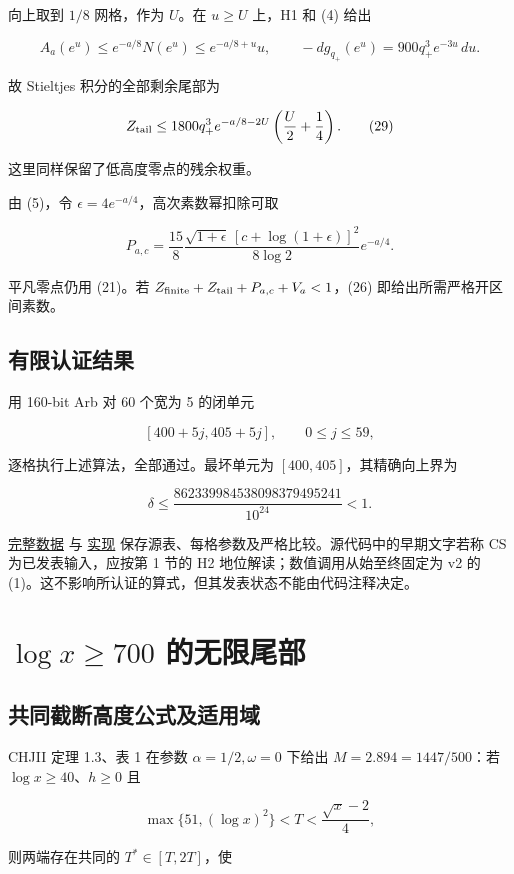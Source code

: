 \documentclass[UTF8,zihao=-4,fontset=fandol]{ctexart}
\begin{document}
向上取到 \(1/8\) 网格，作为 \(U\)。在 \(u\ge U\) 上，H1 和 (4) 给出

\[
A_a(e^u)\le e^{-a/8}N(e^u)\le e^{-a/8+u}u,
\qquad -dg_{q_+}(e^u)=900q_+^3e^{-3u}\,du.
\]

故 Stieltjes 积分的全部剩余尾部为

\[
Z_{\rm tail}\le1800q_+^3e^{-a/8-2U}
\left(\frac U2+\frac14\right). \tag{29}
\]

这里同样保留了低高度零点的残余权重。

由 (5)，令 \(\epsilon=4e^{-a/4}\)，高次素数幂扣除可取

\[
P_{a,c}=\frac{15}{8}
\frac{\sqrt{1+\epsilon}\,[c+\log(1+\epsilon)]^2}{8\log2}
e^{-a/4}. \tag{30}
\]

平凡零点仍用 (21)。若 \(Z_{\rm finite}+Z_{\rm tail}+P_{a,c}+V_a<1\)，(26) 即给出所需严格开区间素数。

\subsection{有限认证结果}

用 160-bit Arb 对 60 个宽为 5 的闭单元

\[
[400+5j,405+5j],\qquad0\le j\le59,
\]

逐格执行上述算法，全部通过。最坏单元为 \([400,405]\)，其精确向上界为

\[
\delta\le\frac{862339984538098379495241}{10^{24}}<1. \tag{31}
\]

\href{../results/smooth_segment_certificate.json}{完整数据} 与 \href{../code/certify_smooth_segment.py}{实现} 保存源表、每格参数及严格比较。源代码中的早期文字若称 CS 为已发表输入，应按第 1 节的 H2 地位解读；数值调用从始至终固定为 v2 的 (1)。这不影响所认证的算式，但其发表状态不能由代码注释决定。

\section{\(\log x\ge700\) 的无限尾部}

\subsection{共同截断高度公式及适用域}

CHJII 定理 1.3、表 1 在参数 \(\alpha=1/2,\omega=0\) 下给出 \(M=2.894=1447/500\)：若 \(\log x\ge40\)、\(h\ge0\) 且

\[
\max\{51,(\log x)^2\}<T<\frac{\sqrt x-2}{4}, \tag{32}
\]

则两端存在共同的 \(T^*\in[T,2T]\)，使
\end{document}
